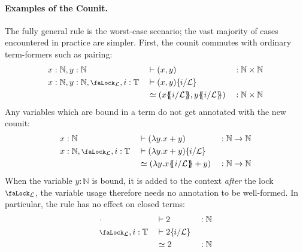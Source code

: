 \documentclass[10pt]{article}
\theoremstyle{definition}
\let\oldequiv\equiv%
\renewcommand{\equiv}{\simeq}
\newcommand{\defeq}{\oldequiv}
\newcommand{\yields}{\vdash}
\newcommand*{\NN}{\mathbb{N}}
\newcommand{\lock}{\mathchoice {\scalebox{0.8}{\text{\faLock}}}
  {\scalebox{0.8}{\text{\faLock}}} {\scalebox{0.5}{\text{\faLock}}}
  {\scalebox{0.4}{\text{\faLock}}} }
\newcommand{\Tiny}{\mathbb{T}}
\newcommand{\lockn}[1]{\mathcal{#1}}
\newcommand{\ctxlocke}[1]{\lock_{#1}}
\newcommand{\ctxlock}[1]{\ctxlocke{\lockn{#1}}}
\newcommand{\stubra}[1]{\{\!\!\{ #1 \}\!\!\}}
\newcommand{\admbra}[1]{\{\mkern-1mu #1 \mkern-0.5mu\}}
\newcommand{\subkeysep}[2]{#1/#2}
\newcommand{\subkeyo}[2]{\subkeysep{#1}{\lockn{#2}}}
\newcommand{\subkey}[2]{\admbra{\subkeyo{#1}{#2}}}
\newcommand{\substuck}[2]{\stubra{#1/\lockn{#2}}}
\begin{document}
\begin{itemize}
\end{itemize}

\paragraph{Examples of the Counit.} The fully general rule is the
worst-case scenario; the vast majority of cases encountered in
practice are simpler. First, the counit commutes with ordinary
term-formers such as pairing:
\begin{alignat*}{3}
  &x : \NN,  y : \NN
  &&\yields (x, y) &&: \NN \times \NN \\
  &x : \NN,  y : \NN, \ctxlock{L}, i : \Tiny
  &&\yields (x, y)\subkey{i}{L} \\
  &&&\defeq (x\substuck{i}{L}, y\substuck{i}{L}) &&: \NN \times \NN 
\end{alignat*}
Any variables which are bound in a term do not get annotated with the new counit:
\begin{alignat*}{3}
  &x : \NN
  &&\yields (\lambda y. x + y) &&: \NN \to \NN  \\
  &x : \NN,\ctxlock{L}, i : \Tiny
  &&\yields (\lambda y. x + y)\subkey{i}{L} \\
  &&&\defeq (\lambda y. x\substuck{i}{L} + y) &&: \NN \to \NN 
\end{alignat*}
When the variable $y : \NN$ is bound, it is added to the context
\emph{after} the lock $\ctxlock{L}$, the variable usage therefore
needs no annotation to be well-formed. In particular, the rule has no
effect on closed terms:
\begin{alignat*}{3}
  &\cdot
  &&\yields 2 &&: \NN  \\
  &\ctxlock{L}, i : \Tiny
  &&\yields 2\subkey{i}{L} \\
  &&&\defeq 2 &&: \NN
\end{alignat*}
\end{document}
